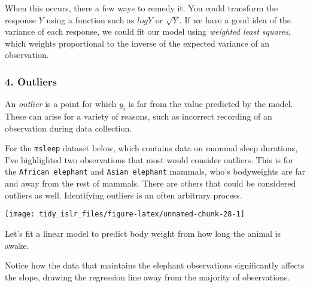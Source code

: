 \documentclass[]{book}
\newenvironment{Shaded}{\begin{snugshade}}{\end{snugshade}}
\newcommand{\DataTypeTok}[1]{\textcolor[rgb]{0.13,0.29,0.53}{#1}}
\newcommand{\DecValTok}[1]{\textcolor[rgb]{0.00,0.00,0.81}{#1}}
\newcommand{\KeywordTok}[1]{\textcolor[rgb]{0.13,0.29,0.53}{\textbf{#1}}}
\newcommand{\NormalTok}[1]{#1}
\newcommand{\OperatorTok}[1]{\textcolor[rgb]{0.81,0.36,0.00}{\textbf{#1}}}
\newcommand{\StringTok}[1]{\textcolor[rgb]{0.31,0.60,0.02}{#1}}
\begin{document}
When this occurs, there a few ways to remedy it. You could transform the response \(Y\) using a function such as \(logY\) or \(\sqrt{Y}\). If we have a good idea of the variance of each response, we could fit our model using \emph{weighted least squares}, which weights proportional to the inverse of the expected variance of an observation.

\hypertarget{outliers}{%
\subsubsection{4. Outliers}\label{outliers}}

An \emph{outlier} is a point for which \(y_i\) is far from the value predicted by the model. These can arise for a variety of reasons, such as incorrect recording of an observation during data collection.

For the \texttt{msleep} dataset below, which contains data on mammal sleep durations, I've highlighted two observations that most would consider outliers. This is for the \texttt{African\ elephant} and \texttt{Asian\ elephant} mammals, who's bodyweights are far and away from the rest of mammals. There are others that could be considered outliers as well. Identifying outliers is an often arbitrary process.

\begin{Shaded}
\end{Shaded}

\begin{center}\texttt{[image: tidy\_islr\_files/figure-latex/unnamed-chunk-28-1]} \end{center}

Let's fit a linear model to predict body weight from how long the animal is awake.

Notice how the data that maintains the elephant observations significantly affects the slope, drawing the regression line away from the majority of observations.
\end{document}
